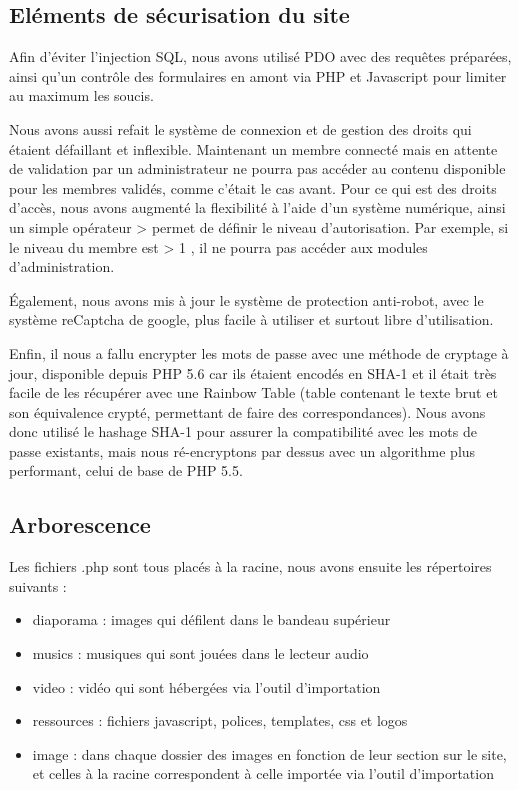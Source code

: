 \documentclass[11pt]{report}
\begin{document}
\subsection{Eléments de sécurisation du site}
Afin d'éviter l'injection SQL, nous avons utilisé PDO avec des requêtes
préparées, ainsi qu'un contrôle des formulaires en amont via PHP et Javascript
pour limiter au maximum les soucis. \\
\par Nous avons aussi refait le système de connexion et de gestion des droits
qui étaient défaillant et inflexible. Maintenant un membre connecté mais
en attente de validation par un administrateur ne pourra pas accéder au contenu
disponible pour les membres validés, comme c'était le cas avant. Pour ce qui est
des droits d'accès, nous avons augmenté la flexibilité à l'aide d'un système
numérique, ainsi un simple opérateur \og > \fg{} permet de définir le niveau
d'autorisation. Par exemple, si le niveau du membre est \og > 1 \fg{}, il ne
pourra pas accéder aux modules d'administration. \\
\par Également, nous avons mis à jour le système de protection anti-robot, avec
le système reCaptcha de google, plus facile à utiliser et surtout libre 
d'utilisation.

\par Enfin, il nous a fallu encrypter les mots de passe avec une méthode de
cryptage à jour, disponible depuis PHP 5.6 car ils étaient encodés en SHA-1 et
il était très facile de les récupérer avec une Rainbow Table (table contenant 
le texte brut et son équivalence crypté, permettant de faire des 
correspondances). Nous avons donc
utilisé le hashage SHA-1 pour assurer la compatibilité avec les mots de passe
existants, mais nous ré-encryptons par dessus avec un algorithme plus
performant, celui de base de PHP 5.5.

\subsection{Arborescence}
Les fichiers .php sont tous placés à la racine, nous avons ensuite les
répertoires suivants : \\
\begin{itemize}
\item diaporama : images qui défilent dans le bandeau
supérieur
\item musics : musiques qui sont jouées dans le lecteur audio
\item video : vidéo qui sont hébergées via l'outil d'importation
\item ressources : fichiers javascript, polices, templates, css et logos 
\item image : dans chaque dossier des images en fonction de leur section sur
le site, et celles à la racine correspondent à celle importée via l'outil
d'importation
\end{itemize}
\end{document}
